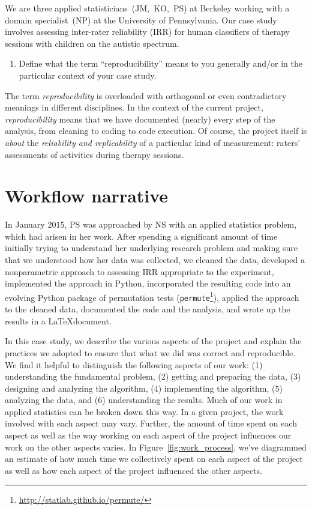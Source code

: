 \documentclass[]{article}
\begin{document}
We are three applied statisticians~(JM,~KO,~PS) at Berkeley working with a
domain specialist~(NP) at the University of Pennsylvania. Our case study
involves assessing inter-rater reliability (IRR) for human classifiers of
therapy sessions with children on the autistic spectrum.

\begin{enumerate}
\def\labelenumi{\arabic{enumi})}
\setcounter{enumi}{1}
\itemsep1pt\parskip0pt
\item
  Define what the term ``reproducibility'' means to you generally and/or
  in the particular context of your case study.
\end{enumerate}

The term \emph{reproducibility} is overloaded with orthogonal or even
contradictory meanings in different disciplines. In the context of the current
project, \emph{reproducibility} means that we have documented (nearly) every
step of the analysis, from cleaning to coding to code execution. Of course, the
project itself is \emph{about} the \emph{reliability and replicability} of a
particular kind of measurement: raters' assessments of activities during
therapy sessions.


\section{Workflow narrative}\label{workflow-narrative}

In January 2015, PS was approached by NS with an applied statistics
problem, which had arisen in her work.
After spending a significant amount of time initially trying to understand her
underlying research problem and making sure that we understood how her data was
collected, we cleaned the data, developed a nonparametric approach to assessing
IRR appropriate to the experiment, implemented the approach in Python,
incorporated the resulting code into an evolving Python package of permutation
tests (\texttt{permute}\footnote{\url{http://statlab.github.io/permute/}}),
applied the approach to the cleaned data, documented the code and the analysis,
and wrote up the results in a \LaTeX document. 

In this case study, we describe the various aspects of the project and explain
the practices we adopted to ensure that what we did was correct and
reproducible.
We find it helpful to distinguish the following aspects of our work:  (1)
understanding the fundamental problem, (2) getting and preparing the data,
(3) designing and analyzing the algorithm, (4) implementing the algorithm,
(5) analyzing the data, and (6) understanding the results.
Much of our work in applied statistics can be broken down this way.
In a given project, the work involved with each aspect may vary.
Further, the amount of time spent on each aspect as well as the way
working on each aspect of the project influences our work on the
other aspects varies.
In Figure~\ref{fig:work_process}, we've diagrammed an estimate of how much time
we collectively spent on each aspect of the project as well as how each aspect
of the project influenced the other aspects.
\end{document}
